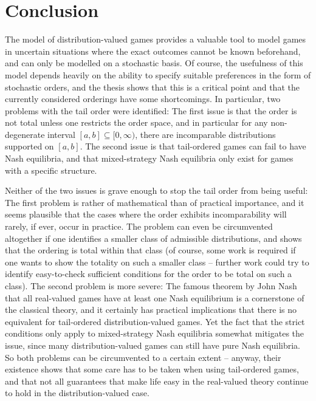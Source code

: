 \documentclass[a4paper,DIV=11]{scrreprt}
\theoremstyle{definition}
\begin{document}
    
    \chapter{Conclusion}
    The model of distribution-valued games provides a valuable tool to model games in uncertain situations where the exact outcomes cannot be known beforehand, and can only be modelled on a stochastic basis. Of course, the usefulness of this model depends heavily on the ability to specify suitable preferences in the form of stochastic orders, and the thesis shows that this is a critical point and that the currently considered orderings have some shortcomings. In particular, two problems with the tail order were identified: The first issue is that the order is not total unless one restricts the order space, and in particular for any non-degenerate interval $[a, b] \subseteq [0, \infty)$, there are incomparable distributions supported on $[a, b]$. The second issue is that tail-ordered games can fail to have Nash equilibria, and that mixed-strategy Nash equilibria only exist for games with a specific structure. 
    
    Neither of the two issues is grave enough to stop the tail order from being useful: The first problem is rather of mathematical than of practical importance, and it seems plausible that the cases where the order exhibits incomparability will rarely, if ever, occur in practice. The problem can even be circumvented altogether if one identifies a smaller class of admissible distributions, and shows that the ordering is total within that class (of course, some work is required if one wants to show the totality on such a smaller class -- further work could try to identify easy-to-check sufficient conditions for the order to be total on such a class). The second problem is more severe: The famous theorem by John Nash that all real-valued games have at least one Nash equilibrium is a cornerstone of the classical theory, and it certainly has practical implications that there is no equivalent for tail-ordered distribution-valued games. Yet  the fact that the strict conditions only apply to mixed-strategy Nash equilibria somewhat mitigates the issue, since many distribution-valued games can still have pure Nash equilibria.
    So both problems can be circumvented to a certain extent -- anyway, their existence shows that some care has to be taken when using tail-ordered games, and that not all guarantees that make life easy in the real-valued theory continue to hold in the distribution-valued case.
    
\end{document}
